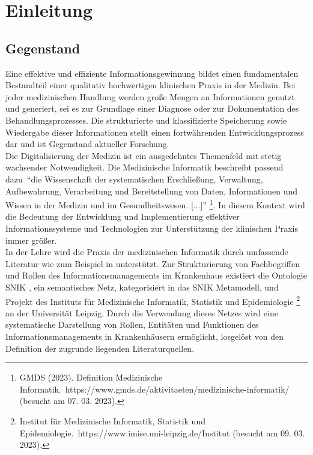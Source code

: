 \chapter{Einleitung}\label{ch:introduction}
\section{Gegenstand}\label{sec:gegenstand}
Eine effektive und effiziente Informationsgewinnung bildet einen fundamentalen Bestandteil einer qualitativ hochwertigen klinischen Praxis in der Medizin. 
Bei jeder medizinischen Handlung werden große Mengen an Informationen genutzt und generiert, sei es zur Grundlage einer Diagnose oder zur Dokumentation des Behandlungsprozesses. 
Die strukturierte und klassifizierte Speicherung sowie Wiedergabe dieser Informationen stellt einen fortwährenden Entwicklungsprozess dar und ist Gegenstand aktueller Forschung.\\

Die Digitalisierung der Medizin ist ein ausgedehntes Themenfeld mit stetig wachsender Notwendigkeit. 
Die Medizinische Informatik beschreibt passend dazu~\enquote{die Wissenschaft der systematischen Erschließung, Verwaltung, Aufbewahrung, Verarbeitung und Bereitstellung von Daten, Informationen und Wissen in der Medizin und im Gesundheitswesen. [$\dots$]}
\footnote{\raggedright{}GMDS (2023). Definition Medizinische Informatik.\  https://www.gmds.de/aktivitaeten/medizinische-informatik/ (besucht am 07. 03. 2023).}.
In diesem Kontext wird die Bedeutung der Entwicklung und Implementierung effektiver Informationssysteme und Technologien zur Unterstützung der klinischen Praxis immer größer.\\

In der Lehre wird die Praxis der medizinischen Informatik durch umfassende Literatur wie zum Beispiel in \citet{bb} unterstützt.
Zur Strukturierung von Fachbegriffen und Rollen des Informationsmanagements im Krankenhaus existiert die Ontologie SNIK \citep{semantischesnetz}, ein semantisches Netz, kategorisiert in das SNIK Metamodell, und Projekt des Instituts für Medizinische Informatik, Statistik und Epidemiologie 
\footnote{\raggedright{}Institut für Medizinische Informatik, Statistik und Epidemiologie.\ https://www.imise.uni-leipzig.de/Institut (besucht am 09. 03. 2023).} an der Universität Leipzig.
Durch die Verwendung dieses Netzes wird eine systematische Darstellung von Rollen, Entitäten und Funktionen des Informationsmanagements in Krankenhäusern ermöglicht, losgelöst von den Definition der zugrunde liegenden Literaturquellen.\\

